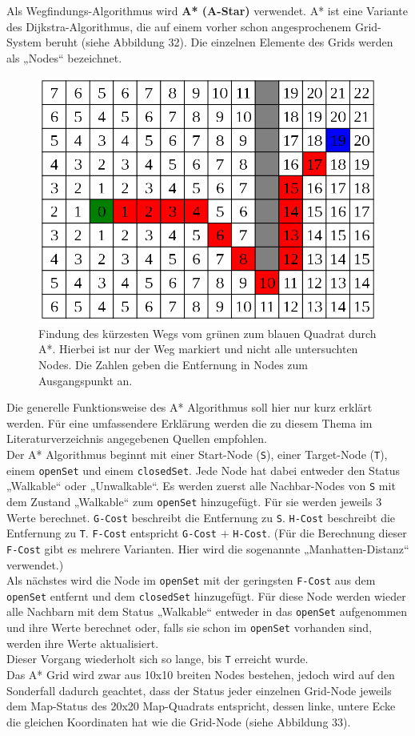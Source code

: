 \documentclass[a4paper,12pt]{article}
\newcommand{\code}{\texttt}
\begin{document}
Als Wegfindungs-Algorithmus wird \textbf{A* (A-Star)} verwendet. A* ist eine Variante des Dijkstra-Algorithmus, die auf einem vorher schon angesprochenem Grid-System beruht (siehe Abbildung 32). Die einzelnen Elemente des Grids werden als „Nodes“ bezeichnet.
\begin{figure}[H]
\centering
    \includegraphics[width=.8\linewidth]{Bilder/Aufgabe3/Teilaufgabe_A/AStar_01.png}
    \caption{Findung des kürzesten Wegs vom grünen zum blauen Quadrat durch A*. Hierbei ist nur der Weg markiert und nicht alle untersuchten Nodes. Die Zahlen geben die Entfernung in Nodes zum Ausgangspunkt an.}
\end{figure}

Die generelle Funktionsweise des A* Algorithmus soll hier nur kurz erklärt werden. Für eine umfassendere Erklärung werden die zu diesem Thema im Literaturverzeichnis angegebenen Quellen empfohlen.
\\[0.4cm]
Der A* Algorithmus beginnt mit einer Start-Node (\code{S}), einer Target-Node (\code{T}), einem \code{openSet} und einem \code{closedSet}. Jede Node hat dabei entweder den Status „Walkable“ oder „Unwalkable“. Es werden zuerst alle Nachbar-Nodes von \code{S} mit dem Zustand „Walkable“ zum \code{openSet} hinzugefügt. Für sie werden jeweils 3 Werte berechnet. \code{G-Cost} beschreibt die Entfernung zu \code{S}. \code{H-Cost} beschreibt die Entfernung zu \code{T}. \code{F-Cost} entspricht \code{G-Cost} + \code{H-Cost}. (Für die Berechnung dieser \code{F-Cost} gibt es mehrere Varianten. Hier wird die sogenannte „Manhatten-Distanz“ verwendet.)
\\[0.4cm]
Als nächstes wird die Node im \code{openSet} mit der geringsten \code{F-Cost} aus dem \code{openSet} entfernt und dem \code{closedSet} hinzugefügt. Für diese Node werden wieder alle Nachbarn mit dem Status „Walkable“ entweder in das \code{openSet} aufgenommen und ihre Werte berechnet oder, falls sie schon im \code{openSet} vorhanden sind, werden ihre Werte aktualisiert.
\\[0.4cm]
Dieser Vorgang wiederholt sich so lange, bis \code{T} erreicht wurde.
\\[0.4cm]
Das A* Grid wird zwar aus 10x10 breiten Nodes bestehen, jedoch wird auf den Sonderfall dadurch geachtet, dass der Status jeder einzelnen Grid-Node jeweils dem Map-Status des 20x20 Map-Quadrats entspricht, dessen linke, untere Ecke die gleichen Koordinaten hat wie die Grid-Node (siehe Abbildung 33).
\end{document}
